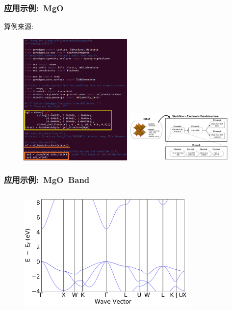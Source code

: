 \documentclass[cjk,slidestop,handout,compress,mathserif,blue]{beamer}	%
\begin{document}
\frame
{
	\frametitle{\textrm{应用示例:~\textrm{MgO}}}
	算例来源:~\fontsize{7.5pt}{6.2pt}
\begin{figure}[h!]
\centering
\vspace*{-0.05in}
\hspace*{-0.10in}
\includegraphics[height=2.6in,width=2.2in,viewport=0 0 475 515,clip]{Figures/Atomate-ASE_MgO.png}
\includegraphics[height=1.0in]{Figures/bandstructure_wf.png}
\label{Atomate-ASE_MgO}
\end{figure} 
}

\frame
{
	\frametitle{应用示例:~\textrm{MgO~Band}}
\begin{figure}[h!]
\centering
\vspace*{-0.1in}
\includegraphics[height=2.5in,width=3.5in,viewport=0 0 900 600,clip]{Figures/Atomate_MgO-Band.png}
\label{Atomate_MgO-Band}
\end{figure} 
}
\end{document}
